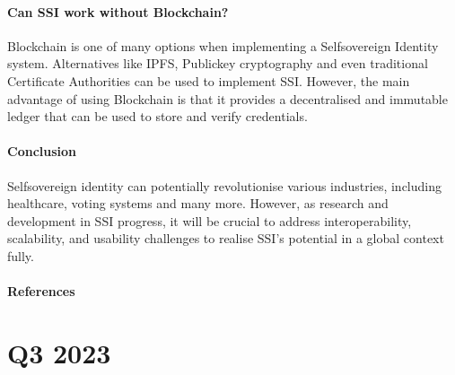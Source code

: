 \documentclass[letterpaper,10pt,english]{jupyterBook}
\begin{document}
\subsection{Can SSI work without Blockchain?}
\label{\detokenize{SSI/ssi:can-ssi-work-without-blockchain}}
\sphinxAtStartPar
Blockchain is one of many options when implementing a Self\sphinxhyphen{}sovereign Identity system. Alternatives like IPFS, Public\sphinxhyphen{}key cryptography and even traditional Certificate Authorities can be used to implement SSI. However, the main advantage of using Blockchain is that it provides a decentralised and immutable ledger that can be used to store and verify credentials.


\subsection{Conclusion}
\label{\detokenize{SSI/ssi:conclusion}}
\sphinxAtStartPar
Self\sphinxhyphen{}sovereign identity can potentially revolutionise various industries, including healthcare, voting systems and many more. However, as research and development in SSI progress, it will be
crucial to address interoperability, scalability, and usability challenges to realise SSI’s potential in a global context fully.




\subsection{References}
\label{\detokenize{SSI/ssi:references}}
\sphinxstepscope


\part{Q3 2023}

\sphinxstepscope
\end{document}
